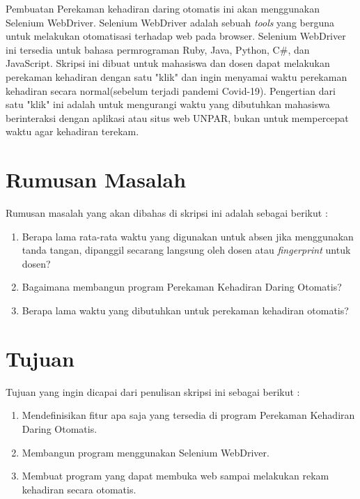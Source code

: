 \documentclass[a4paper,twoside]{article}
\begin{document}
Pembuatan Perekaman kehadiran daring otomatis ini akan menggunakan Selenium WebDriver. Selenium WebDriver adalah sebuah \textit{tools} yang berguna untuk melakukan otomatisasi terhadap web pada browser. Selenium WebDriver ini tersedia untuk bahasa permrograman Ruby, Java, Python, C\#, dan JavaScript. Skripsi ini dibuat untuk mahasiswa dan dosen dapat melakukan perekaman kehadiran dengan satu "klik" dan ingin menyamai waktu perekaman kehadiran secara normal(sebelum terjadi pandemi Covid-19). Pengertian dari satu "klik" ini adalah untuk mengurangi waktu yang dibutuhkan mahasiswa berinteraksi dengan aplikasi atau situs web UNPAR, bukan untuk mempercepat waktu agar kehadiran terekam. 

\section{Rumusan Masalah}
Rumusan masalah yang akan dibahas di skripsi ini adalah sebagai berikut :
\begin{enumerate}
	\item Berapa lama rata-rata waktu yang digunakan untuk absen jika menggunakan tanda tangan, dipanggil secarang langsung oleh dosen atau \textit{fingerprint} untuk dosen?
	\item Bagaimana membangun program Perekaman Kehadiran Daring Otomatis?
	\item Berapa lama waktu yang dibutuhkan untuk perekaman kehadiran otomatis?
	
\end{enumerate}

\section{Tujuan}
Tujuan yang ingin dicapai dari penulisan skripsi ini sebagai berikut :
\begin{enumerate}
	\item Mendefinisikan fitur apa saja yang tersedia di program Perekaman Kehadiran Daring Otomatis.
	\item Membangun program menggunakan Selenium WebDriver.
	\item Membuat program yang dapat membuka web sampai melakukan rekam kehadiran secara otomatis.
	
\end{enumerate}
\end{document}
